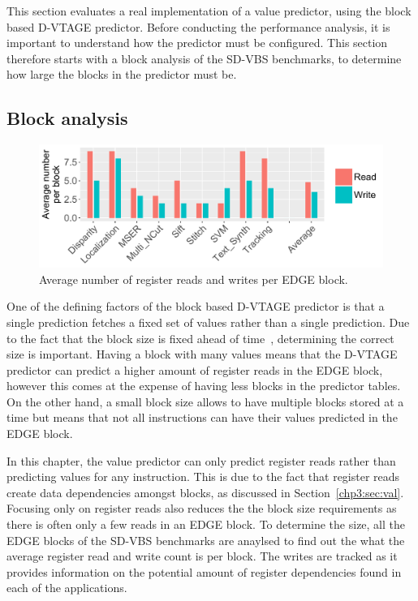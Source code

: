 This section evaluates a real implementation of a value predictor, using the block based D-VTAGE predictor.
Before conducting the performance analysis, it is important to understand how the predictor must be configured.
This section therefore starts with a block analysis of the SD-VBS benchmarks, to determine how large the blocks in the predictor must be.


\subsection{Block analysis}
\begin{figure}[t]
    \centering
    \includegraphics[width=1\textwidth]{chapter3/graphics/averageRegRead.pdf}

    \caption{Average number of register reads and writes per EDGE block.}
    \label{fig:edge_reg_read}
	\vspace{1em}
\end{figure}

One of the defining factors of the block based D-VTAGE predictor is that a single prediction fetches a fixed set of values rather than a single prediction.
Due to the fact that the block size is fixed ahead of time~\cite{peraisBeBop2015}, determining the correct size is important.
Having a block with many values means that the D-VTAGE predictor can predict a higher amount of register reads in the EDGE block, however this comes at the expense of having less blocks in the predictor tables.
On the other hand, a small block size allows to have multiple blocks stored at a time but means that not all instructions can have their values predicted in the EDGE block.

In this chapter, the value predictor can only predict register reads rather than predicting values for any instruction.
This is due to the fact that register reads create data dependencies amongst blocks, as discussed in Section~\ref{chp3:sec:val}.
Focusing only on register reads also reduces the the block size requirements as there is often only a few reads in an EDGE block.
To determine the size, all the EDGE blocks of the SD-VBS benchmarks are anaylsed to find out the what the average register read and write count is per block.
The writes are tracked as it provides information on the potential amount of register dependencies found in each of the applications.

